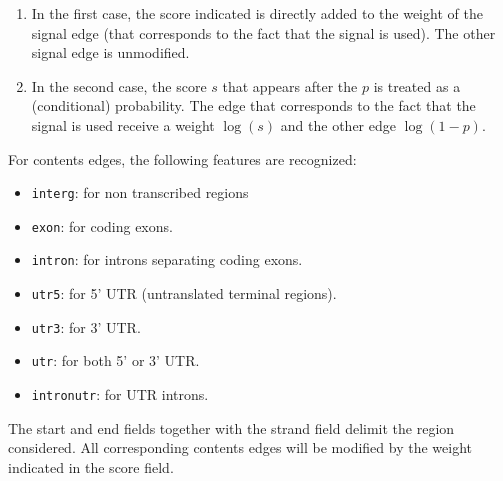 \begin{enumerate}
\item In the first case, the score indicated is directly added to the
  weight of the signal edge (that corresponds to the fact that the
  signal is used). The other signal edge is unmodified.
\item In the second case, the score $s$ that appears after the $p$ is
  treated as a (conditional) probability. The edge that corresponds to
  the fact that the signal is used receive a weight $\log(s)$ and the
  other edge $\log(1-p)$.
\end{enumerate}

For contents edges, the following features are recognized:
\begin{itemize}
\item \texttt{interg}: for non transcribed regions
\item \texttt{exon}: for coding exons.
\item \texttt{intron}: for introns separating coding exons.
\item \texttt{utr5}: for 5' UTR (untranslated terminal regions).
\item \texttt{utr3}: for 3' UTR.
\item \texttt{utr}: for both 5' or 3' UTR.
\item \texttt{intronutr}: for UTR introns.
\end{itemize}
The start and end fields together with the strand field delimit the
region considered. All corresponding contents edges will be modified
by the weight indicated in the score field.



